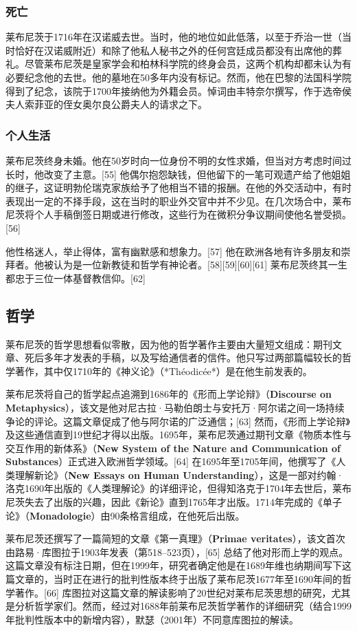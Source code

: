 \subsubsection{死亡}
莱布尼茨于1716年在汉诺威去世。当时，他的地位如此低落，以至于乔治一世（当时恰好在汉诺威附近）和除了他私人秘书之外的任何宫廷成员都没有出席他的葬礼。尽管莱布尼茨是皇家学会和柏林科学院的终身会员，这两个机构却都未认为有必要纪念他的去世。他的墓地在50多年内没有标记。然而，他在巴黎的法国科学院得到了纪念，该院于1700年接纳他为外籍会员。悼词由丰特奈尔撰写，作于选帝侯夫人索菲亚的侄女奥尔良公爵夫人的请求之下。
\subsubsection{个人生活}
莱布尼茨终身未婚。他在50岁时向一位身份不明的女性求婚，但当对方考虑时间过长时，他改变了主意。[55] 他偶尔抱怨缺钱，但他留下的一笔可观遗产给了他姐姐的继子，这证明勃伦瑞克家族给予了他相当不错的报酬。在他的外交活动中，有时表现出一定的不择手段，这在当时的职业外交官中并不少见。在几次场合中，莱布尼茨将个人手稿倒签日期或进行修改，这些行为在微积分争议期间使他名誉受损。[56]

他性格迷人，举止得体，富有幽默感和想象力。[57] 他在欧洲各地有许多朋友和崇拜者。他被认为是一位新教徒和哲学有神论者。[58][59][60][61] 莱布尼茨终其一生都忠于三位一体基督教信仰。[62]
\subsection{哲学}
莱布尼茨的哲学思想看似零散，因为他的哲学著作主要由大量短文组成：期刊文章、死后多年才发表的手稿，以及写给通信者的信件。他只写过两部篇幅较长的哲学著作，其中仅1710年的《神义论》（*Théodicée*）是在他生前发表的。

莱布尼茨将自己的哲学起点追溯到1686年的《形而上学论辩》（\textbf{Discourse on Metaphysics}），该文是他对尼古拉·马勒伯朗士与安托万·阿尔诺之间一场持续争论的评论。这篇文章促成了他与阿尔诺的广泛通信；[63] 然而，《形而上学论辩》及这些通信直到19世纪才得以出版。1695年，莱布尼茨通过期刊文章《物质本性与交互作用的新体系》（\textbf{New System of the Nature and Communication of Substances}）正式进入欧洲哲学领域。[64] 在1695年至1705年间，他撰写了《人类理解新论》（\textbf{New Essays on Human Understanding}），这是一部对约翰·洛克1690年出版的《人类理解论》的详细评论，但得知洛克于1704年去世后，莱布尼茨失去了出版的兴趣，因此《新论》直到1765年才出版。1714年完成的《单子论》（\textbf{Monadologie}）由90条格言组成，在他死后出版。

莱布尼茨还撰写了一篇简短的文章《第一真理》（\textbf{Primae veritates}），该文首次由路易·库图拉于1903年发表（第518–523页），[65] 总结了他对形而上学的观点。这篇文章没有标注日期，但在1999年，研究者确定他是在1689年维也纳期间写下这篇文章的，当时正在进行的批判性版本终于出版了莱布尼茨1677年至1690年间的哲学著作。[66] 库图拉对这篇文章的解读影响了20世纪对莱布尼茨思想的研究，尤其是分析哲学家们。然而，经过对1688年前莱布尼茨哲学著作的详细研究（结合1999年批判性版本中的新增内容），默瑟（2001年）不同意库图拉的解读。

